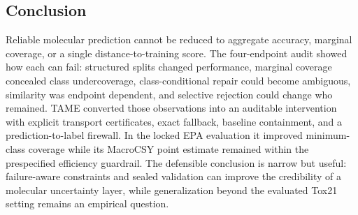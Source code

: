 \subsection{Conclusion}

Reliable molecular prediction cannot be reduced to aggregate accuracy, marginal coverage, or a single distance-to-training score. The four-endpoint audit showed how each can fail: structured splits changed performance, marginal coverage concealed class undercoverage, class-conditional repair could become ambiguous, similarity was endpoint dependent, and selective rejection could change who remained. TAME converted those observations into an auditable intervention with explicit transport certificates, exact fallback, baseline containment, and a prediction-to-label firewall. In the locked EPA evaluation it improved minimum-class coverage while its MacroCSY point estimate remained within the prespecified efficiency guardrail. The defensible conclusion is narrow but useful: failure-aware constraints and sealed validation can improve the credibility of a molecular uncertainty layer, while generalization beyond the evaluated Tox21 setting remains an empirical question.
